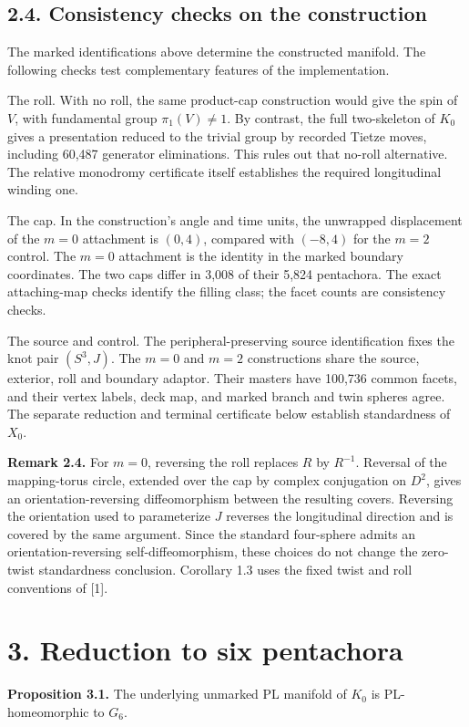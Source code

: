 \documentclass[11pt,letterpaper]{article}
\begin{document}
\subsection*{2.4. Consistency checks on the construction}
The marked identifications above determine the constructed manifold. The following checks test complementary features of the implementation.

The roll. With no roll, the same product-cap construction would give the spin of $V$, with fundamental group $\pi_1(V)\neq1$. By contrast, the full two-skeleton of $K_0$ gives a presentation reduced to the trivial group by recorded Tietze moves, including 60,487 generator eliminations. This rules out that no-roll alternative. The relative monodromy certificate itself establishes the required longitudinal winding one.

The cap. In the construction's angle and time units, the unwrapped displacement of the $m=0$ attachment is $(0,4)$, compared with $(-8,4)$ for the $m=2$ control. The $m=0$ attachment is the identity in the marked boundary coordinates. The two caps differ in 3,008 of their 5,824 pentachora. The exact attaching-map checks identify the filling class; the facet counts are consistency checks.

The source and control. The peripheral-preserving source identification fixes the knot pair $(S^3,J)$. The $m=0$ and $m=2$ constructions share the source, exterior, roll and boundary adaptor. Their masters have 100,736 common facets, and their vertex labels, deck map, and marked branch and twin spheres agree. The separate reduction and terminal certificate below establish standardness of $X_0$.

\medskip\noindent\textbf{Remark 2.4.} For $m=0$, reversing the roll replaces $R$ by $R^{-1}$. Reversal of the mapping-torus circle, extended over the cap by complex conjugation on $D^2$, gives an orientation-reversing diffeomorphism between the resulting covers. Reversing the orientation used to parameterize $J$ reverses the longitudinal direction and is covered by the same argument. Since the standard four-sphere admits an orientation-reversing self-diffeomorphism, these choices do not change the zero-twist standardness conclusion. Corollary 1.3 uses the fixed twist and roll conventions of [1].

\section*{3. Reduction to six pentachora}
\medskip\noindent\textbf{Proposition 3.1.} The underlying unmarked PL manifold of $K_0$ is PL-homeomorphic to $G_6$.
\end{document}

